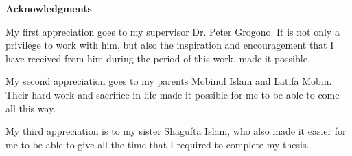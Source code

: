 \newpage
{}
\label{acknowledgments}
\begin{center}
\Large \textbf{Acknowledgments}\\[0.5cm]
\end{center}

My first appreciation goes to my supervisor Dr. Peter Grogono. It is not only a privilege to work with him, but also the inspiration and encouragement that I have received from him during the period of this work, made it possible.

My second appreciation goes to my parents Mobinul Islam and Latifa Mobin. Their hard work and sacrifice in life made it possible for me to be able to come all this way.

My third appreciation is to my sister Shagufta Islam, who also made it easier for me to be able to give all the time that I required to complete my thesis.
